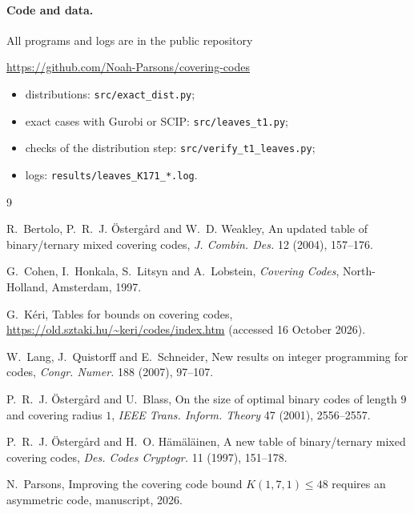 \documentclass[11pt]{article}
\theoremstyle{remark}
\begin{document}
\paragraph{Code and data.} All programs and logs are in the public repository
\begin{center}\url{https://github.com/Noah-Parsons/covering-codes}\end{center}
\begin{itemize}
\item distributions: \texttt{src/exact\_dist.py};
\item exact cases with Gurobi or SCIP: \texttt{src/leaves\_t1.py};
\item checks of the distribution step: \texttt{src/verify\_t1\_leaves.py};
\item logs: \texttt{results/leaves\_K171\_*.log}.
\end{itemize}

\begin{thebibliography}{9}

 R.~Bertolo, P.~R.~J. Östergård and W.~D. Weakley, An updated table of
binary/ternary mixed covering codes, \emph{J. Combin. Des.} 12 (2004), 157--176.

 G.~Cohen, I.~Honkala, S.~Litsyn and A.~Lobstein, \emph{Covering Codes},
North-Holland, Amsterdam, 1997.

 G.~Kéri, Tables for bounds on covering codes,
\url{https://old.sztaki.hu/~keri/codes/index.htm} (accessed 16 October 2026).

 W.~Lang, J.~Quistorff and E.~Schneider, New results on integer programming for
codes, \emph{Congr. Numer.} 188 (2007), 97--107.

 P.~R.~J. Östergård and U.~Blass, On the size of optimal binary codes of length $9$
and covering radius $1$, \emph{IEEE Trans. Inform. Theory} 47 (2001), 2556--2557.

 P.~R.~J. Östergård and H.~O. Hämäläinen, A new table of binary/ternary mixed
covering codes, \emph{Des. Codes Cryptogr.} 11 (1997), 151--178.

 N.~Parsons, Improving the covering code bound $K(1,7,1)\le 48$ requires an
asymmetric code, manuscript, 2026.

\end{thebibliography}
\end{document}
